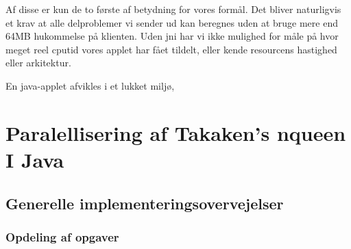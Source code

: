 \documentclass[draft,a4paper,10pt]{article}
\begin{document}
Af disse er kun de to første af betydning for vores formål. Det bliver naturligvis et krav at alle delproblemer vi sender ud kan beregnes uden at bruge mere end 64MB hukommelse på klienten. Uden jni har vi ikke mulighed for måle på hvor meget reel cputid vores applet har fået tildelt, eller kende resourcens hastighed eller arkitektur. 

En java-applet afvikles i et lukket miljø, 



\section{Paralellisering af Takaken's nqueen I Java}

\subsection{Generelle implementeringsovervejelser}
\subsubsection{Opdeling af opgaver}
\end{document}
